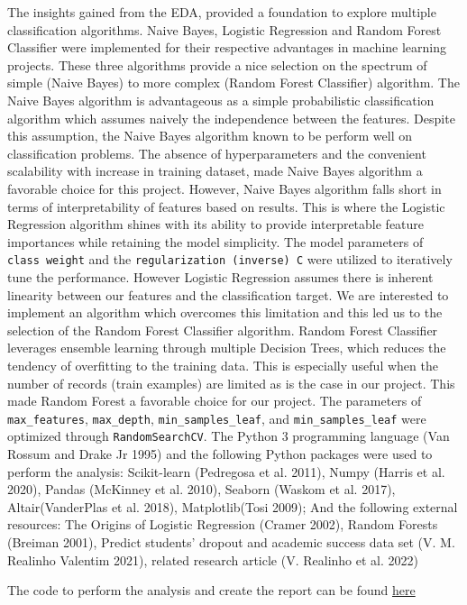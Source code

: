 \documentclass[
]{article}
\begin{document}
The insights gained from the EDA, provided a foundation to explore
multiple classification algorithms. Naive Bayes, Logistic Regression and
Random Forest Classifier were implemented for their respective
advantages in machine learning projects. These three algorithms provide
a nice selection on the spectrum of simple (Naive Bayes) to more complex
(Random Forest Classifier) algorithm. The Naive Bayes algorithm is
advantageous as a simple probabilistic classification algorithm which
assumes naively the independence between the features. Despite this
assumption, the Naive Bayes algorithm known to be perform well on
classification problems. The absence of hyperparameters and the
convenient scalability with increase in training dataset, made Naive
Bayes algorithm a favorable choice for this project. However, Naive
Bayes algorithm falls short in terms of interpretability of features
based on results. This is where the Logistic Regression algorithm shines
with its ability to provide interpretable feature importances while
retaining the model simplicity. The model parameters of
\texttt{class\ weight} and the \texttt{regularization\ (inverse)\ C}
were utilized to iteratively tune the performance. However Logistic
Regression assumes there is inherent linearity between our features and
the classification target. We are interested to implement an algorithm
which overcomes this limitation and this led us to the selection of the
Random Forest Classifier algorithm. Random Forest Classifier leverages
ensemble learning through multiple Decision Trees, which reduces the
tendency of overfitting to the training data. This is especially useful
when the number of records (train examples) are limited as is the case
in our project. This made Random Forest a favorable choice for our
project. The parameters of \texttt{max\_features}, \texttt{max\_depth},
\texttt{min\_samples\_leaf}, and \texttt{min\_samples\_leaf} were
optimized through \texttt{RandomSearchCV}. The Python 3 programming
language (Van Rossum and Drake Jr 1995) and the following Python
packages were used to perform the analysis: Scikit-learn (Pedregosa et
al. 2011), Numpy (Harris et al. 2020), Pandas (McKinney et al. 2010),
Seaborn (Waskom et al. 2017), Altair(VanderPlas et al. 2018),
Matplotlib(Tosi 2009); And the following external resources: The Origins
of Logistic Regression (Cramer 2002), Random Forests (Breiman 2001),
Predict students' dropout and academic success data set (V. M. Realinho
Valentim 2021), related research article (V. Realinho et al. 2022)

The code to perform the analysis and create the report can be found
\href{https://github.com/UBC-MDS/dropout-predictions}{here}
\end{document}
